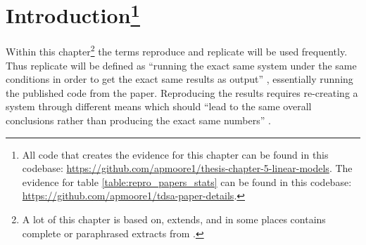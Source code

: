 %
%
%
%

\section[Introduction]{Introduction\footnote{All code that creates the evidence for this chapter can be found in this codebase: \url{https://github.com/apmoore1/thesis-chapter-5-linear-models}. The evidence for table \ref{table:repro_papers_stats} can be found in this codebase: \url{https://github.com/apmoore1/tdsa-paper-details}.}}
\label{section:repro_intro}

Within this chapter\footnote{A lot of this chapter is based on, extends, and in some places contains complete or paraphrased extracts from \citet{moore-rayson-2018-bringing}.} the terms reproduce and replicate will be used frequently. Thus replicate will be defined as ``running the exact same system under the same conditions in order to get the exact same results as output'' \citep{fokkens-etal-2013-offspring}, essentially running the published code from the paper. Reproducing the results requires re-creating a system through different means which should ``lead to the same overall conclusions rather than producing the exact same numbers'' \citep{fokkens-etal-2013-offspring}. 

